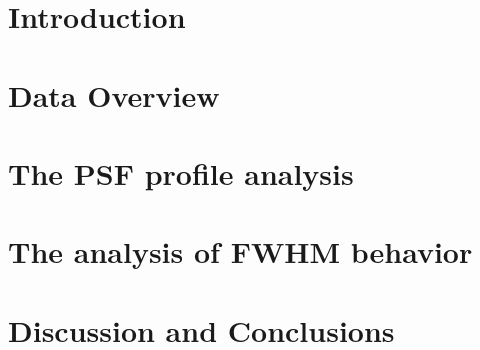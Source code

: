 \documentclass{aastex62}
\begin{document}


\section{Introduction}

 

\section{Data Overview} 

 


\section{The PSF profile analysis}

 


\section{The analysis of FWHM behavior} 

 

\section{Discussion and Conclusions} 
\end{document}
